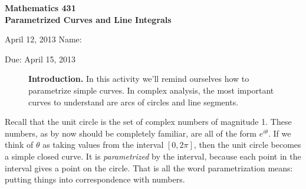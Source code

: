 \documentclass[11pt]{exam}
\begin{document}
\noindent
\textbf{{\large Mathematics 431 \\ Parametrized Curves and Line Integrals}}

\noindent
April 12, 2013 \hfill Name: \underline{\hspace{3in}} 

\noindent
Due: April 15, 2013

\noindent
\begin{figure}[h]
\centering
\begin{minipage}[b]{0.85\linewidth}
\textbf{Introduction.} In this activity we'll remind ourselves how to parametrize simple curves. In complex analysis, the most important curves to understand are arcs of circles and line segments.
\end{minipage}
\end{figure}

Recall that the unit circle is the set of complex numbers of magnitude 1. These numbers, as by now should be completely familiar, are all of the form $e^{i \theta}$. If we think of $\theta$ as taking values from the interval $[0, 2\pi]$, then the unit circle becomes a simple closed curve. It is \emph{parametrized} by the interval, because each point in the interval gives a point on the circle. That is all the word parametrization means: putting things into correspondence with numbers.
\end{document}
